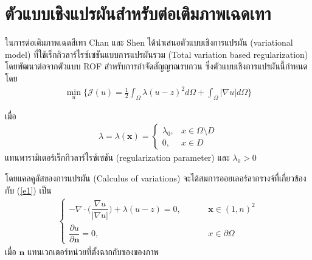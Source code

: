 \section{ตัวแบบเชิงแปรผันสำหรับต่อเติมภาพเฉดเทา}\label{inpaint-model-grayscale}

\hspace{1cm} ในการต่อเติมภาพเฉดสีเทา Chan และ Shen \cite{ref:rof-inpaint-chan-shen} ได้นำเสนอตัวแบบเชิงการแปรผัน (variational model) ที่ใช้เร็กกิวลาร์ไรซ์เซชันแบบการแปรผันรวม (Total variation based regularization) โดยพัฒนาต่อจากตัวแบบ ROF สำหรับการกำจัดสัญญาณรบกวน \cite{ref:ROF-template} ซึ่งตัวแบบเชิงการแปรผันนี้กำหนดโดย
\begin{align}
    \min_{u} \{ \mathcal{J}(u) = \frac{1}{2} \int_{\Omega}\lambda (u-z)^2 d\Omega +  \int_{\Omega}  |\nabla u|  d\Omega \}
\label{e1}
\end{align}

เมื่อ 
\begin{align}
    \lambda=\lambda(\mathbf{x}) = \left \{ \begin{array}{ll}  \lambda_0, & x \in \Omega \setminus D \\ 0, & x \in D  \end{array} \right . 
    \label{e2}
\end{align}
แทนพารามิเตอร์เร็กกิวลาร์ไรซ์เซชัน (regularization parameter) และ $\lambda_0 >0$

\hspace{1cm} โดยแคลคูลัสของการแปรผัน (Calculus of variations) จะได้สมการออยเลอร์ลากรางจ์ที่เกี่ยวข้องกับ (\ref{e1}) เป็น 
\begin{align}
    \left \{ \begin{array}{ll}  - \nabla \cdot  \Big( \dfrac{\nabla u}{|\nabla u|} \Big) + \lambda (u-z) = 0,  & \hspace{1cm} \mathbf{x} \in (1,n)^2 \\ \dfrac{\partial u}{\partial \boldsymbol{n}} = 0, & \hspace{1cm} x \in \partial \Omega \end{array} \right . 
    \label{e3}
\end{align}
เมื่อ $\boldsymbol{n}$ แทนเวกเตอร์หน่วยที่ตั้งฉากกับของของภาพ
